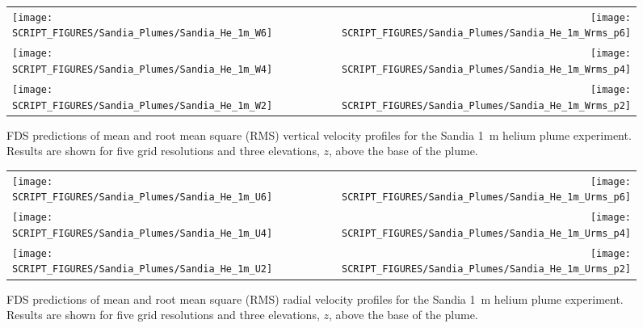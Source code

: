 \newpage

\begin{figure}[p]
\begin{tabular*}{\textwidth}{l@{\extracolsep{\fill}}r}
\texttt{[image: SCRIPT\_FIGURES/Sandia\_Plumes/Sandia\_He\_1m\_W6]} &
\texttt{[image: SCRIPT\_FIGURES/Sandia\_Plumes/Sandia\_He\_1m\_Wrms\_p6]} \\
\texttt{[image: SCRIPT\_FIGURES/Sandia\_Plumes/Sandia\_He\_1m\_W4]} &
\texttt{[image: SCRIPT\_FIGURES/Sandia\_Plumes/Sandia\_He\_1m\_Wrms\_p4]} \\
\texttt{[image: SCRIPT\_FIGURES/Sandia\_Plumes/Sandia\_He\_1m\_W2]} &
\texttt{[image: SCRIPT\_FIGURES/Sandia\_Plumes/Sandia\_He\_1m\_Wrms\_p2]}
\end{tabular*}
\caption[Sandia 1~m helium plume vertical velocity profiles]
{FDS predictions of mean and root mean square (RMS) vertical velocity profiles for the Sandia 1~m helium plume experiment. Results are shown for five grid resolutions and three elevations, $z$, above the base of the plume.}
\label{Sandia_He_1m_velocity}
\end{figure}

\begin{figure}[p]
\begin{tabular*}{\textwidth}{l@{\extracolsep{\fill}}r}
\texttt{[image: SCRIPT\_FIGURES/Sandia\_Plumes/Sandia\_He\_1m\_U6]} &
\texttt{[image: SCRIPT\_FIGURES/Sandia\_Plumes/Sandia\_He\_1m\_Urms\_p6]} \\
\texttt{[image: SCRIPT\_FIGURES/Sandia\_Plumes/Sandia\_He\_1m\_U4]} &
\texttt{[image: SCRIPT\_FIGURES/Sandia\_Plumes/Sandia\_He\_1m\_Urms\_p4]} \\
\texttt{[image: SCRIPT\_FIGURES/Sandia\_Plumes/Sandia\_He\_1m\_U2]} &
\texttt{[image: SCRIPT\_FIGURES/Sandia\_Plumes/Sandia\_He\_1m\_Urms\_p2]}
\end{tabular*}
\caption[Sandia 1~m helium plume radial velocity profiles]
{FDS predictions of mean and root mean square (RMS) radial velocity profiles for the Sandia 1~m helium plume experiment. Results are shown for five grid resolutions and three elevations, $z$, above the base of the plume.}
\label{Sandia_He_1m_velocity_rms}
\end{figure}

